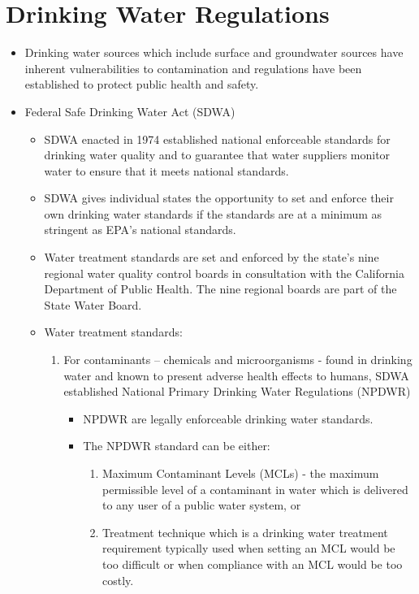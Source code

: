 \section{Drinking Water Regulations}
\begin{itemize}
\item Drinking water sources which include surface and groundwater sources have inherent vulnerabilities to contamination and regulations have been established to protect public health and safety.

\item Federal Safe Drinking Water Act (SDWA)
\begin{itemize}
\item SDWA enacted in 1974 established national enforceable standards for drinking water quality and to guarantee that water suppliers monitor water to ensure that it meets national standards. \\

\item SDWA gives individual states the opportunity to set and enforce their own drinking water standards if the standards are at a minimum as stringent as EPA's national standards.

\item Water treatment standards are set and enforced by the state’s nine regional water quality control boards in consultation with the California Department of Public Health. The nine regional boards are part of the State Water Board.

\item Water treatment standards:
\begin{enumerate}
\item For contaminants – chemicals and microorganisms - found in drinking water and known to present adverse health effects to humans, SDWA established National Primary Drinking Water Regulations (NPDWR)

\begin{itemize}
\item NPDWR are legally enforceable drinking water standards.  
\item The NPDWR standard can be either:
\begin{enumerate}
\item Maximum Contaminant Levels (MCLs) - the maximum permissible level of a contaminant in water which is delivered to any user of a public water system,  or 
\item Treatment technique which is a drinking water treatment requirement typically used when setting an MCL would be too difficult or when compliance with an MCL would be too costly.
\end{enumerate}


\end{itemize}
\end{enumerate}
\end{itemize}
\end{itemize}
